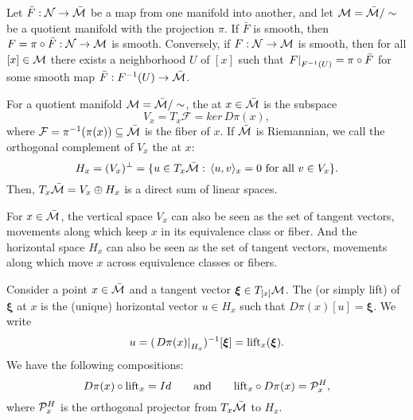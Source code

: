 \documentclass[11pt,a4paper]{article}
\begin{document}

\begin{prop}
Let $\bar{F}:\mathcal{N}\rightarrow \bar{\mathcal{M}}$ be a map from one manifold into another, and let $\mathcal{M} = \bar{\mathcal{M}}/\sim$ be a quotient manifold with the projection $\pi$. If $\bar{F}$ is smooth, then $F = \pi\circ \bar{F}:\mathcal{N}\rightarrow \mathcal{M}$ is smooth. Conversely, if $F:\mathcal{N}\rightarrow \mathcal{M}$ is smooth, then for all $[x]\in \mathcal{M}$ there exists a neighborhood $U$ of $[x]$ such that $\left.F\right|_{F^{-1}(U)} = \pi\circ \bar{F}$ for some smooth map $\bar{F}:F^{-1}(U)\rightarrow \bar{\mathcal{M}}$. 
\end{prop}

\begin{mydef}
For a quotient manifold $\mathcal{M} = \bar{\mathcal{M}}/\sim$, the  at $x\in\bar{\mathcal{M}}$ is the subspace
\begin{equation*}
    V_x = T_x\mathcal{F} = ker\,D\pi(x),
\end{equation*}
where $\mathcal{F} = \pi^{-1}(\pi(x))\subseteq \bar{\mathcal{M}}$ is the fiber of $x$. If $\bar{\mathcal{M}}$ is Riemannian, we call the orthogonal complement of $V_x$ the  at $x$:
\begin{equation*}
H_x = (V_x)^\perp  = \{u\in T_x\bar{\mathcal{M}}:\, \langle u, v \rangle_x = 0\text{ for all }v\in V_x\}.
\end{equation*}
Then, $T_x\bar{\mathcal{M}} = V_x\oplus H_x$ is a direct sum of linear spaces.
\end{mydef}

For $x\in \bar{\mathcal{M}}$, the vertical space $V_x$ can also be seen as the set of tangent vectors, movements along which keep $x$ in its equivalence class or fiber. And the horizontal space $H_x$ can also be seen as the set of tangent vectors, movements along which move $x$ across equivalence classes or fibers.

\begin{mydef}
Consider a point $x\in \bar{\mathcal{M}}$ and a tangent vector $\boldsymbol\xi\in T_{[x]}\mathcal{M}$. The  (or simply lift) of $\boldsymbol\xi$ at $x$ is the (unique) horizontal vector $u\in H_x$ such that $D\pi(x)[u] = \boldsymbol\xi$. We write
\begin{equation*}
    u = (\left.D\pi(x)\right|_{H_x})^{-1}[\boldsymbol\xi] = \text{lift}_x(\boldsymbol\xi).
\end{equation*}
We have the following compositions:
\begin{equation*}
D\pi(x)\circ \text{lift}_x = Id\qquad\text{and}\qquad \text{lift}_x\circ D\pi(x) = \mathcal{P}_x^H,
\end{equation*}
where $\mathcal{P}_x^H$ is the orthogonal projector from $T_x\bar{\mathcal{M}}$ to $H_x$.
\end{mydef}
\end{document}
